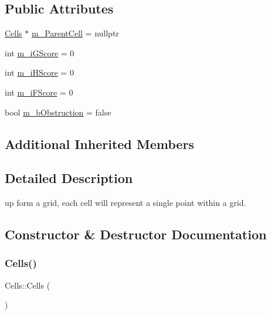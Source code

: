 \subsection*{Public Attributes}
\begin{DoxyCompactItemize}
\item 
\mbox{\hyperlink{class_cells}{Cells}} $\ast$ \mbox{\hyperlink{class_cells_ae71aff17afdd01c99293906893c67354}{m\+\_\+\+Parent\+Cell}} = nullptr
\item 
int \mbox{\hyperlink{class_cells_abe9c29d1ede13bf4fe3980ab837e81ce}{m\+\_\+i\+G\+Score}} = 0
\item 
int \mbox{\hyperlink{class_cells_a00f6a71c14e40130259bbdeb15394f67}{m\+\_\+i\+H\+Score}} = 0
\item 
int \mbox{\hyperlink{class_cells_a4c0eadc267ff60babcabe97347d9e452}{m\+\_\+i\+F\+Score}} = 0
\item 
bool \mbox{\hyperlink{class_cells_a0bc31e333f70a4d5aefd1fa5e14fa0fb}{m\+\_\+b\+Obstruction}} = false
\end{DoxyCompactItemize}
\subsection*{Additional Inherited Members}


\subsection{Detailed Description}
up form a grid, each cell will represent a single point within a grid. 

\subsection{Constructor \& Destructor Documentation}
\mbox{\label{class_cells_a092d62bc15648a54755a413dbf9a2db0}} 
\subsubsection{\texorpdfstring{Cells()}{Cells()}}
{\footnotesize\ttfamily Cells\+::\+Cells (\begin{DoxyParamCaption}{ }\end{DoxyParamCaption})}

\mbox{\label{class_cells_aab121634db81b439226a33fd099fb3c1}} 
